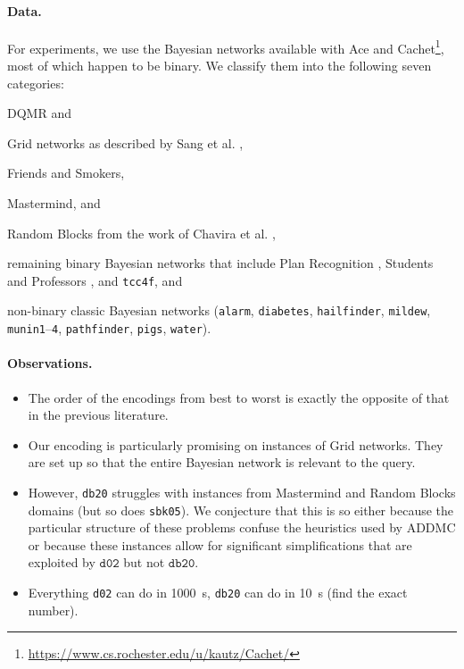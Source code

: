 \documentclass{article}
\theoremstyle{definition}
\theoremstyle{remark}
\begin{document}
{\paragraph{Data.} For experiments, we use the Bayesian networks available
with Ace and
Cachet\footnote{\url{https://www.cs.rochester.edu/u/kautz/Cachet/}}, most of
which happen to be binary. We classify them into the following seven categories:
\begin{itemize*}
\item DQMR and
\item Grid networks as described by Sang et al. \cite{DBLP:conf/aaai/SangBK05},
\item Friends and Smokers,
\item Mastermind, and
\item Random Blocks from the work of Chavira et al.
  \cite{DBLP:journals/ijar/ChaviraDJ06},
\item remaining binary Bayesian networks that include Plan Recognition
  \cite{DBLP:conf/aaai/SangBK05}, Students and Professors
  \cite{DBLP:journals/ijar/ChaviraDJ06}, and \texttt{tcc4f}, and
\item non-binary classic Bayesian networks (\texttt{alarm}, \texttt{diabetes},
  \texttt{hailfinder}, \texttt{mildew}, \texttt{munin1}--\texttt{4},
  \texttt{pathfinder}, \texttt{pigs}, \texttt{water}).
\end{itemize*}

\paragraph{Observations.}
\begin{itemize}
\item The order of the encodings from best to worst is exactly the opposite of
  that in the previous literature.
\item Our encoding is particularly promising on instances of Grid networks.
  They are set up so that the entire Bayesian network is relevant to the
  query.
\item However, \texttt{db20} struggles with instances from Mastermind and
  Random Blocks domains (but so does \texttt{sbk05}). We conjecture that this
  is so either because the particular structure of these problems confuse the
  heuristics used by ADDMC or because these instances allow for significant
  simplifications that are exploited by $\mathtt{d02}$ but not
  $\mathtt{db20}$.
\item Everything \texttt{d02} can do in \SI{1000}{\second}, \texttt{db20} can do
  in \SI{10}{\second} (find the exact number).
\end{itemize}

}
\end{document}
